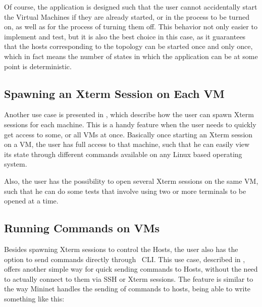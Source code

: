 Of course, the application is designed such that the user cannot accidentally start the Virtual Machines if they are already started, or in the process to be turned on, as well as for the process of turning them off.
This behavior not only easier to implement and test, but it is also the best choice in this case, as it guarantees that the hosts corresponding to the topology can be started once and only once, which in fact means the number of states in which the application can be at some point is deterministic.

\subsection{Spawning an Xterm Session on Each VM}
\label{sub-sec:spawn-xterm}


Another use case is presented in , which describe how the user can spawn Xterm sessions for each machine.
This is a handy feature when the user needs to quickly get access to some, or all VMs at once.
Basically once starting an Xterm session on a VM, the user has full access to that machine, such that he can easily view its state through different commands available on any Linux based operating system.

Also, the user has the possibility to open several Xterm sessions on the same VM, such that he can do some tests that involve using two or more terminals to be opened at a time.

\subsection{Running Commands on VMs}
\label{sub-sec:run-cmd}


Besides spawning Xterm sessions to control the Hosts, the user also has the option to send commands directly through \project\ CLI.
This use case, described in , offers another simple way for quick sending commands to Hosts, without the need to actually connect to them via SSH or Xterm sessions.
The feature is similar to the way Mininet handles the sending of commands to hosts, being able to write something like this:

